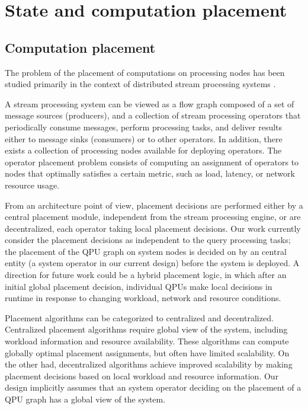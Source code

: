 \section{State and computation placement}
\label{sec:placement}
\subsection{Computation placement}

The problem of the placement of computations on processing nodes has been studied primarily in the context of distributed
stream processing systems \cite{lakshmanan:placementstrategies}.

A stream processing system can be viewed as a flow graph composed of a set of message sources (producers),
and a collection of stream processing operators that periodically consume messages, perform processing tasks,
and deliver results either to message sinks (consumers) or to other operators.
In addition, there exists a collection of processing nodes available for deploying operators.
The operator placement problem consists of computing an assignment of operators to nodes that optimally satisfies a
certain metric, such as load, latency, or network resource usage.

From an architecture point of view, placement decisions are performed either by a central placement module, independent
from the stream processing engine, or are decentralized, each operator taking local placement decisions.
Our work currently consider the placement decisions as independent to the query processing tasks;
the placement of the QPU graph on system nodes is decided on by an central entity (a system operator in our current design)
before the system is deployed.
A direction for future work could be a hybrid placement logic, in which after an initial global placement decision,
individual QPUs make local decisions in runtime in response to changing workload, network and resource conditions.

Placement algorithms can be categorized to centralized and decentralized.
Centralized placement algorithms require global view of the system, including workload information and resource availability.
These algorithms can compute globally optimal placement assignments, but often have limited scalability.
On the other had, decentralized algorithms achieve improved scalability by making placement decisions based on local
workload and resource information.
Our design implicitly assumes that an system operator deciding on the placement of a QPU graph has a global view of the
system.


